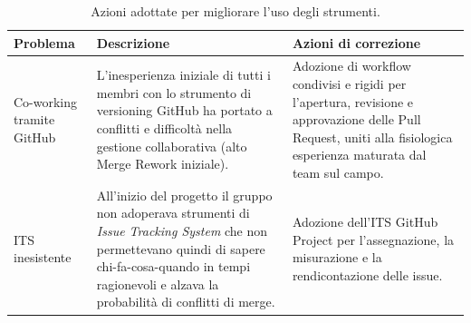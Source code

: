 \documentclass[a4paper, 10pt, colorlinks=true, linkcolor=black, urlcolor=blue, citecolor=blue, hidelinks]{article}
\begin{document}
\begin{table}[H]
    \centering
    \renewcommand{\arraystretch}{1.5}
    \begin{tabularx}{\textwidth}{|>{\raggedright\arraybackslash}p{3.5cm}|>{\raggedright\arraybackslash}X|>{\raggedright\arraybackslash}X|}
        \hline
        \textbf{Problema} & \textbf{Descrizione} & \textbf{Azioni di correzione} \\ \hline
        
        Co-working tramite GitHub & L'inesperienza iniziale di tutti i membri con lo strumento di versioning GitHub ha portato a conflitti e difficoltà nella gestione collaborativa (alto Merge Rework iniziale). & Adozione di workflow condivisi e rigidi per l'apertura, revisione e approvazione delle Pull Request, uniti alla fisiologica esperienza maturata dal team sul campo. \\ \hline
        
        ITS inesistente & All'inizio del progetto il gruppo non adoperava strumenti di \textit{Issue Tracking System} che non permettevano quindi di sapere chi-fa-cosa-quando in tempi ragionevoli e alzava la probabilità di conflitti di merge. & Adozione dell'ITS GitHub Project per l'assegnazione, la misurazione e la rendicontazione delle issue. \\ \hline
    \end{tabularx}
    \caption{Azioni adottate per migliorare l'uso degli strumenti.}
    \label{tab:azioni-str}
\end{table}
\end{document}
